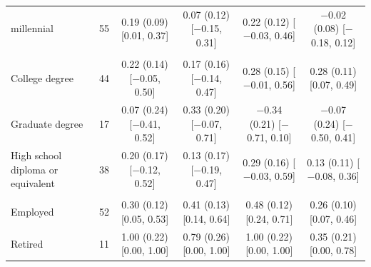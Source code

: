 \begin{table}[t]
\begin{tabular}{@{}lr*{4}{c}@{}}
\quad millennial & 55 & \makecell{0.19 (0.09)\\ {[}0.01, 0.37{]}} & \makecell{0.07 (0.12)\\ {[}$-$0.15, 0.31{]}} & \makecell{0.22 (0.12)\\ {[}$-$0.03, 0.46{]}} & \makecell{$-$0.02 (0.08)\\ {[}$-$0.18, 0.12{]}} \\
\addlinespace
\multicolumn{6}{@{}l}{\textit{Education (N)}} \\
\quad College degree & 44 & \makecell{0.22 (0.14)\\ {[}$-$0.05, 0.50{]}} & \makecell{0.17 (0.16)\\ {[}$-$0.14, 0.47{]}} & \makecell{0.28 (0.15)\\ {[}$-$0.01, 0.56{]}} & \makecell{0.28 (0.11)\\ {[}0.07, 0.49{]}} \\
\quad Graduate degree & 17 & \makecell{0.07 (0.24)\\ {[}$-$0.41, 0.52{]}} & \makecell{0.33 (0.20)\\ {[}$-$0.07, 0.71{]}} & \makecell{$-$0.34 (0.21)\\ {[}$-$0.71, 0.10{]}} & \makecell{$-$0.07 (0.24)\\ {[}$-$0.50, 0.41{]}} \\
\quad High school diploma or equivalent & 38 & \makecell{0.20 (0.17)\\ {[}$-$0.12, 0.52{]}} & \makecell{0.13 (0.17)\\ {[}$-$0.19, 0.47{]}} & \makecell{0.29 (0.16)\\ {[}$-$0.03, 0.59{]}} & \makecell{0.13 (0.11)\\ {[}$-$0.08, 0.36{]}} \\
\addlinespace
\multicolumn{6}{@{}l}{\textit{Occupation (N)}} \\
\quad Employed & 52 & \makecell{0.30 (0.12)\\ {[}0.05, 0.53{]}} & \makecell{0.41 (0.13)\\ {[}0.14, 0.64{]}} & \makecell{0.48 (0.12)\\ {[}0.24, 0.71{]}} & \makecell{0.26 (0.10)\\ {[}0.07, 0.46{]}} \\
\quad Retired & 11 & \makecell{1.00 (0.22)\\ {[}0.00, 1.00{]}} & \makecell{0.79 (0.26)\\ {[}0.00, 1.00{]}} & \makecell{1.00 (0.22)\\ {[}0.00, 1.00{]}} & \makecell{0.35 (0.21)\\ {[}0.00, 0.78{]}} \\

\end{tabular}
\end{table}
